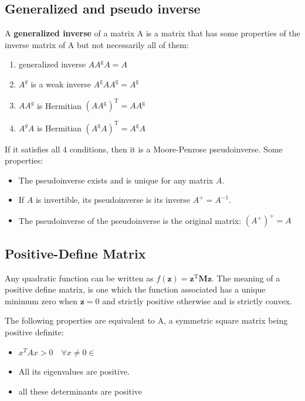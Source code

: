 \documentclass[twocolumn]{article}
\numberwithin{equation}{section}
\begin{document}
	\subsection{Generalized and pseudo inverse}
A \textbf{generalized inverse} of a matrix A is a matrix that has some properties of the inverse matrix of A but not necessarily all of them:
\begin{enumerate}
\item generalized inverse  $AA^{\mathrm g}A = A$ 
\item $A^g$ is a weak inverse $A^{\mathrm g}AA^{\mathrm g}= A^{\mathrm g}$
\item $AA^g$ is Hermitian   $(AA^{\mathrm g})^{\mathrm T} = AA^{\mathrm g}$
\item $A^gA$ is Hermitian  $(A^{\mathrm g}A)^{\mathrm T} = A^{\mathrm g}A $
\end{enumerate} 
If it satisfies all 4 conditions, then it is a Moore-Penrose pseudoinverse. 
Some properties:
\begin{itemize}
	\item The pseudoinverse exists and is unique for any matrix $A$.
	\item If $A$ is invertible, its pseudoinverse is its inverse $A^+=A^{-1}$.
	\item The pseudoinverse of the pseudoinverse is the original matrix: $(A^+)^+=A$
\end{itemize} 



	\subsection{Positive-Define Matrix}
Any quadratic function can be written as $f(\mathbf{z})=\mathbf{z^\mathrm{T}Mz}$. The meaning of a positive define matrix, is one which the function associated has a unique minimum zero when $\mathbf{z}=0$ and strictly positive otherwise and is strictly convex.

The following properties are equivalent to A, a symmetric square matrix being positive definite:
\begin{itemize}
	\item $x^TAx>0 \quad \forall x\neq 0 \in$
	\item All its eigenvalues are positive.
	\item all these determinants are positive
\end{itemize}
\end{document}
